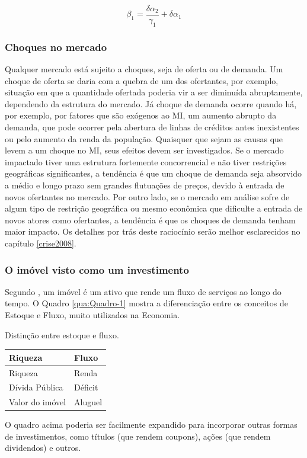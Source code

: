 \documentclass[
	12pt,				%
	oneside,			%
	a4paper,			%
	chapter=TITLE,		%
	section=TITLE,		%
	english,			%
	brazil				%
	]{abntex2}
\begin{document}
\begin{refsection}
\[\beta_1 = \frac{\delta \alpha_2}{\gamma_1} + \delta \alpha_1\]

\hypertarget{choques-no-mercado}{%
\subsubsection{Choques no mercado}\label{choques-no-mercado}}

Qualquer mercado está sujeito a choques, seja de oferta ou de demanda. Um choque
de oferta se daria com a quebra de um dos ofertantes, por exemplo, situação em
que a quantidade ofertada poderia vir a ser diminuída abruptamente, dependendo
da estrutura do mercado. Já choque de demanda ocorre quando há, por exemplo, por
fatores que são exógenos ao \gls{MI}, um aumento abrupto da demanda, que pode
ocorrer pela abertura de linhas de créditos antes inexistentes ou pelo aumento
da renda da população. Quaisquer que sejam as causas que levem a um choque no
\gls{MI}, seus efeitos devem ser investigados. Se o mercado impactado tiver uma
estrutura fortemente concorrencial e não tiver restrições geográficas
significantes, a tendência é que um choque de demanda seja absorvido a médio e
longo prazo sem grandes flutuações de preços, devido à entrada de novos
ofertantes no mercado. Por outro lado, se o mercado em análise sofre de algum
tipo de restrição geográfica ou mesmo econômica que dificulte a entrada de novos
atores como ofertantes, a tendência é que os choques de demanda tenham maior
impacto. Os detalhes por trás deste raciocínio serão melhor esclarecidos no
capítulo \ref{crise2008}.

\hypertarget{o-imuxf3vel-visto-como-um-investimento}{%
\subsubsection{O imóvel visto como um investimento}\label{o-imuxf3vel-visto-como-um-investimento}}

Segundo \textcite{Malpezzi2002TheRO}, um imóvel é um ativo que rende um fluxo de serviços
ao longo do tempo. O Quadro \ref{qua:Quadro-1} mostra a diferenciação entre os
conceitos de Estoque e Fluxo, muito utilizados na Economia.
\begin{quadro}[htb]
    \centering
    \caption{\label{qua:Quadro-1}Distinção entre estoque e fluxo.}  
    \begin{tabular}{|l|l|}
        \hline
        \textbf{Riqueza}  & \textbf{Fluxo}\\ \hline
         Riqueza          & Renda         \\ \hline
         Dívida Pública   & Déficit       \\ \hline
         Valor do imóvel  & Aluguel       \\ \hline
    \end{tabular}
\end{quadro}
O quadro acima poderia ser facilmente expandido para incorporar outras formas de
investimentos, como títulos (que rendem coupons), ações (que rendem dividendos)
e outros.


\end{refsection}
\end{document}
